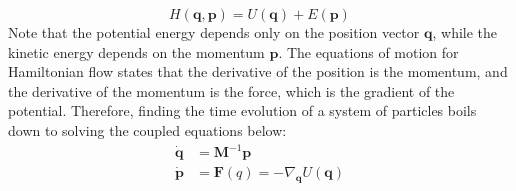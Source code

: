     \begin{equation}
      H(\mathbf{q}, \mathbf{p}) = U(\mathbf{q}) + E(\mathbf{p})
    \end{equation}
    Note that the potential energy depends only on the position vector $\mathbf{q}$, while the kinetic energy depends on the momentum $\mathbf{p}$. The equations of motion for Hamiltonian flow states that the derivative of the position is the momentum, and the derivative of the momentum is the force, which is the gradient of the potential. Therefore, finding the time evolution of a system of particles boils down to solving the coupled equations below: 
    \begin{align*}
      \boldsymbol{\dot{q}} & = \mathbf{M}^{-1} \mathbf{p} \\
      \boldsymbol{\dot{p}} & = \mathbf{F}(q) = - \nabla_\mathbf{q} U(\mathbf{q})
    \end{align*}

